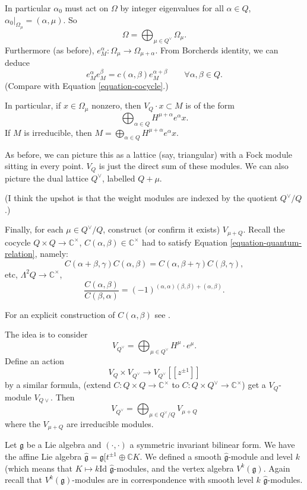 In particular $\alpha_0$ must act on $\Omega$
by integer eigenvalues
for all $\alpha \in Q$,
$\alpha_0|_{\Omega_\mu}=(\alpha,\mu)$.
So
 $$
\Omega=\bigoplus_{\mu \in Q^\vee} \Omega_\mu.
$$
Furthermore (as before),
$e_M^\alpha:\Omega_\mu \to
\Omega_{\mu+\alpha}$.
From Borcherds identity, we can deduce
\begin{equation}
\label{equation-cocycle-m}
e^\alpha_M
e^\beta_M=c(\alpha,\beta)e_M^{\alpha+\beta}
\qquad
\forall \alpha,\beta \in Q.
\end{equation}
(Compare with Equation
\ref{equation-cocycle}.)

\noindent
In particular, if $x \in \Omega_\mu$ nonzero,
then $V_Q\cdot x \subset M$ is of the form
$$
\bigoplus_{\alpha \in
Q}H^{\mu+\alpha}e^\alpha x.
$$
If $M$ is irreducible, then $M=
\bigoplus_{\alpha \in
Q}H^{\mu+\alpha}e^\alpha x$.

As before, we can picture this as a lattice
(say, triangular)
with a Fock module sitting in every point.
$V_Q$ is just
the direct sum of these modules. We can also
picture
the dual lattice $Q^\vee$, labelled $Q+\mu$.

(I think the upshot is that the weight
modules
are indexed by the quotient $Q^\vee/Q$.)

\medskip\noindent
Finally, for each $\mu \in Q^\vee/Q$,
construct
(or confirm it exists) $V_{\mu+Q}$.
Recall the cocycle $Q \times Q \to
\mathbb{C}^\times$,
$C(\alpha,\beta) \in \mathbb{C}^\times$
had to satisfy Equation
\ref{equation-quantum-relation}, namely:
 $$
C(\alpha+\beta,\gamma)C(\alpha,\beta)
=C(\alpha,\beta+\gamma)C(\beta,\gamma),
$$
etc, $\Lambda^2Q \to \mathbb{C}^\times$,
$$
\frac{C(\alpha,\beta)}{C(\beta,\alpha)}
=(-1)^{(\alpha,\alpha)(\beta,\beta)+(\alpha,
\beta)}.
$$

For an explicit construction of
$C(\alpha,\beta)$ see
\cite[Section 5]{KVAB}.

\medskip\noindent
The idea is to consider
$$
V_{Q^\vee}=\bigoplus_{\mu \in
Q^\vee}H^\mu\cdot e^\mu.
$$
Define an action
 $$
V_Q \times V_{Q^\vee} \to V_{Q^\vee}[[z^{\pm
1}]]
$$
by a similar formula,
(extend $C:Q \times Q \to \mathbb{C}^\times$
to $C:Q\times Q^\vee \to \mathbb{C}^\times$)
get a $V_Q$-module $V_{Q\vee}$.
Then
$$
V_{Q^\vee}=\bigoplus_{\mu \in
Q^\vee/Q}V_{\mu+Q}
$$
where the $V_{\mu+Q}$ are irreducible
modules.




\medskip\noindent
\noindent
Let $\mathfrak{g}$ be a Lie algebra and
$(\cdot,\cdot)$ a symmetric invariant
bilinear form.
We have the affine Lie algebra
$\hat{\mathfrak{g}}=\mathfrak{g}[t^{\pm
1}\oplus \mathbb{C}K$.
We defined a smooth
$\hat{\mathfrak{g}}$-module
and level $k$ (which means that $K \mapsto  k
\text{Id}$
$\hat{\mathfrak{g}}$-modules,
and the vertex algebra $V^k(\mathfrak{g})$.
Again recall that $V^k(\mathfrak{g})$-modules
are in correspondence with smooth level $k$
$\hat{\mathfrak{g}}$-modules.

